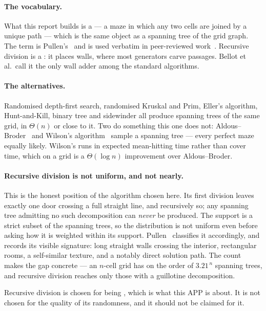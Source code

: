 \paragraph{The vocabulary.}
What this report builds is a  --- a maze in which any two
cells are joined by a unique path --- which is the same object as a spanning
tree of the grid graph. The term is Pullen's~\cite{pullen2026think} and is used
verbatim in peer-reviewed work~\cite{bellot2021how}. Recursive division is a
: it places walls, where most generators carve passages.
Bellot et al.\ call it the only wall adder among the standard algorithms.

\paragraph{The alternatives.}
Randomised depth-first search, randomised Kruskal and Prim, Eller's algorithm,
Hunt-and-Kill, binary tree and sidewinder all produce spanning trees of the same
grid, in $\Theta(n)$ or close to it. Two do something this one does not:
Aldous--Broder~\cite{aldous1990random,broder1989generating} and
Wilson's algorithm~\cite{wilson1996generating} sample a 
spanning tree --- every perfect maze equally likely. Wilson's runs in expected
mean-hitting time rather than cover time, which on a grid is a $\Theta(\log n)$
improvement over Aldous--Broder.

\paragraph{Recursive division is not uniform, and not nearly.}
This is the honest position of the algorithm chosen here. Its first division
leaves exactly one door crossing a full straight line, and recursively so; any
spanning tree admitting no such decomposition can \emph{never} be produced. The
support is a strict subset of the spanning trees, so the distribution is not
uniform even before asking how it is weighted within its support.
Pullen~\cite{pullen2026think} classifies it accordingly, and records its visible
signature: long straight walls crossing the interior, rectangular rooms, a
self-similar texture, and a notably direct solution path. The count makes the
gap concrete --- an $n$-cell grid has on the order of $3.21^{\,n}$ spanning
trees, and recursive division reaches only those with a guillotine
decomposition.

\begin{keypoint}
Recursive division is chosen for being ,
which is what this APP is about. It is not chosen for the quality of its
randomness, and it should not be claimed for it.
\end{keypoint}


